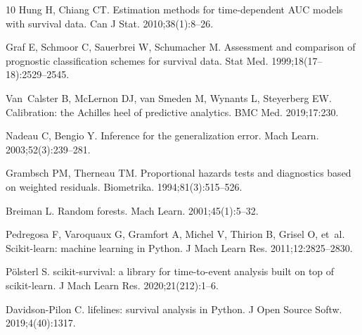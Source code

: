 \documentclass[10pt,letterpaper]{article}
\begin{document}
\begin{thebibliography}{10}
Hung H, Chiang CT.
\newblock Estimation methods for time-dependent {AUC} models with survival
  data.
\newblock Can J Stat. 2010;38(1):8--26.

Graf E, Schmoor C, Sauerbrei W, Schumacher M.
\newblock Assessment and comparison of prognostic classification schemes for
  survival data.
\newblock Stat Med. 1999;18(17--18):2529--2545.

Van~Calster B, McLernon DJ, van Smeden M, Wynants L, Steyerberg EW.
\newblock Calibration: the {Achilles} heel of predictive analytics.
\newblock BMC Med. 2019;17:230.

Nadeau C, Bengio Y.
\newblock Inference for the generalization error.
\newblock Mach Learn. 2003;52(3):239--281.

Grambsch PM, Therneau TM.
\newblock Proportional hazards tests and diagnostics based on weighted
  residuals.
\newblock Biometrika. 1994;81(3):515--526.

Breiman L.
\newblock Random forests.
\newblock Mach Learn. 2001;45(1):5--32.

Pedregosa F, Varoquaux G, Gramfort A, Michel V, Thirion B, Grisel O, et~al.
\newblock Scikit-learn: machine learning in {Python}.
\newblock J Mach Learn Res. 2011;12:2825--2830.

P{\"o}lsterl S.
\newblock scikit-survival: a library for time-to-event analysis built on top of
  scikit-learn.
\newblock J Mach Learn Res. 2020;21(212):1--6.

Davidson-Pilon C.
\newblock lifelines: survival analysis in {Python}.
\newblock J Open Source Softw. 2019;4(40):1317.

\end{thebibliography}
\end{document}
